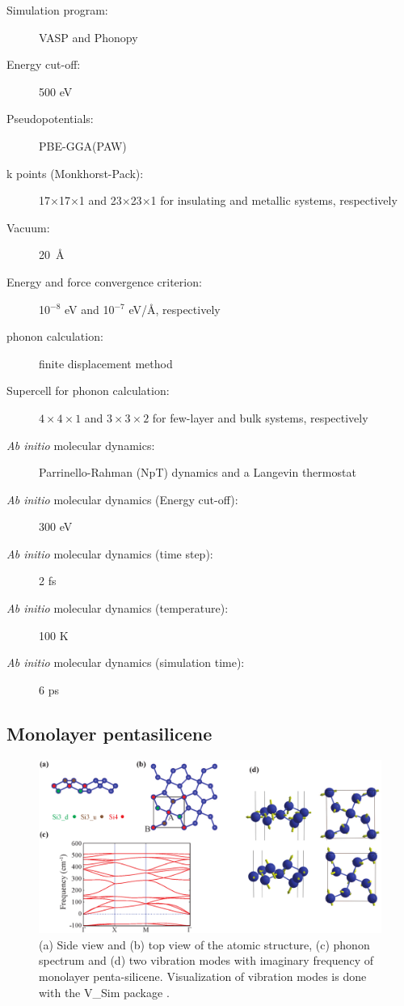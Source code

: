 \begin{footnotesize}
\begin{description}
\item[Simulation program:] VASP and Phonopy
\item[Energy cut-off:] 500 eV
\item[Pseudopotentials:] PBE-GGA(PAW)
\item[k points (Monkhorst-Pack):] 17$\times$17$\times$1 and 23$\times$23$\times$1 for insulating and metallic systems, respectively 
\item[Vacuum:] 20~\AA
\item[Energy and force convergence criterion:] 10$^{-8}$ eV and 10$^{-7}$ eV/\AA, respectively
\item[phonon calculation:] finite displacement method
\item[Supercell for phonon calculation:] $4\times4\times1$ and $3\times3\times2$ for few-layer and bulk systems, respectively
\item[\textit{Ab initio} molecular dynamics:] Parrinello-Rahman (NpT) dynamics \cite{vasp_npt1,vasp_npt2} and a Langevin thermostat \cite{vasp_Lgv}
\item[\textit{Ab initio} molecular dynamics (Energy cut-off):] 300 eV
\item[\textit{Ab initio} molecular dynamics (time step):] 2 fs
\item[\textit{Ab initio} molecular dynamics (temperature):] 100 K
\item[\textit{Ab initio} molecular dynamics (simulation time):] 6 ps
\end{description}
\end{footnotesize}

\subsection{Monolayer pentasilicene}\label{mono}

\begin{figure}[htb]
\centering
\includegraphics[width=\linewidth]{ps_monolayer.eps}%
\caption{(a) Side view and (b) top view of the atomic structure, (c) phonon spectrum and (d) two vibration modes with imaginary frequency of monolayer penta-silicene. Visualization of vibration modes is done with the V\_Sim package \cite{VSim}. \label{fig:ps_monolayer}}
\end{figure}

